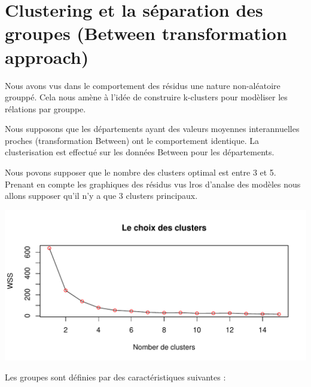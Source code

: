 \documentclass[11pt,]{article}
\begin{document}
\FloatBarrier

\hypertarget{clustering-et-la-separation-des-groupes-between-transformation-approach}{%
\section{Clustering et la séparation des groupes (Between transformation
approach)}\label{clustering-et-la-separation-des-groupes-between-transformation-approach}}

Nous avons vus dans le comportement des résidus une nature non-aléatoire
grouppé. Cela nous amène à l'idée de construire k-clusters pour
modèliser les rélations par grouppe.

\par

Nous supposons que les départements ayant des valeurs moyennes
interannuelles proches (transformation Between) ont le comportement
identique. La clusterisation est effectué sur les données Between pour
les départements.

\par

Nous povons supposer que le nombre des clusters optimal est entre 3 et
5. Prenant en compte les graphiques des résidus vus lros d'analse des
modèles nous allons supposer qu'il n'y a que 3 clusters principaux.

\FloatBarrier

\includegraphics{note2pres_files/figure-latex/unnamed-chunk-69-1.pdf}

\FloatBarrier

Les groupes sont définies par des caractéristiques suivantes :

\FloatBarrier
\end{document}
